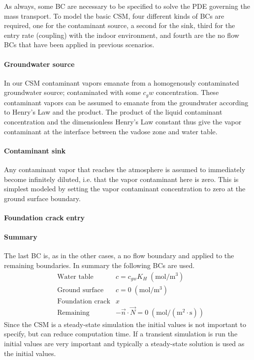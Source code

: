 As always, some BC are necessary to be specified to solve the PDE governing the mass transport.
To model the basic CSM, four different kinds of BCs are required, one for the contaminant source, a second for the sink, third for the entry rate (coupling) with the indoor environment, and fourth are the no flow BCs that have been applied in previous scenarios.

\paragraph{Groundwater source}

In our CSM contaminant vapors emanate from a homogenously contaminated groundwater source; contaminated with some $c_gw$ concentration.
These contaminant vapors can be assumed to emanate from the groundwater according to Henry's Law and the product.
The product of the liquid contaminant concentration and the dimensionless Henry's Law constant thus give the vapor contaminant at the interface between the vadose zone and water table.

\paragraph{Contaminant sink}

Any contaminant vapor that reaches the atmosphere is assumed to immediately become infinitely diluted, i.e. that the vapor contaminant here is zero.
This is simplest modeled by setting the vapor contaminant concentration to zero at the ground surface boundary.

\paragraph{Foundation crack entry}


\paragraph{Summary}

The last BC is, as in the other cases, a no flow boundary and applied to the remaining boundaries.
In summary the following BCs are used.
\begin{align}\label{eq:mass_transport_bc}
  &\text{Water table} &c = c_{gw} K_H \; \mathrm{(mol/m^3)} \\
  &\text{Ground surface} &c = 0 \; \mathrm{(mol/m^3)} \\
  &\text{Foundation crack} &x \\
  &\text{Remaining} &-\vec{n}\cdot\vec{N} = 0 \; \mathrm{(mol/(m^2\cdot s))}
\end{align}
Since the CSM is a steady-state simulation the initial values is not important to specify, but can reduce computation time.
If a transient simulation is run the initial values are very important and typically a steady-state solution is used as the initial values.\par
